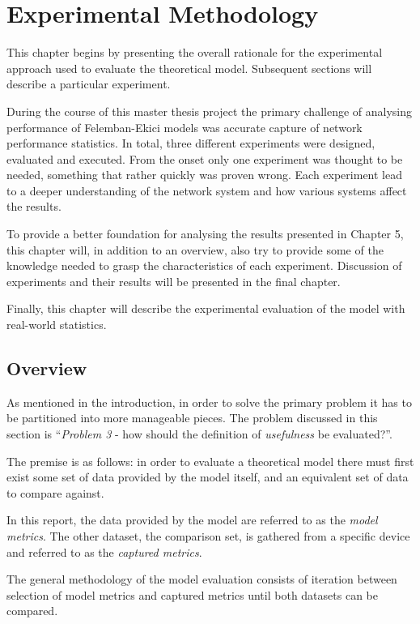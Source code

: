 
\chapter{Experimental Methodology}

This chapter begins by presenting the overall rationale for the experimental
approach used to evaluate the theoretical model. Subsequent sections will
describe a particular experiment.

During the course of this master thesis project the primary challenge of
analysing performance of Felemban-Ekici models was accurate capture of network
performance statistics. In total, three different experiments were designed,
evaluated and executed. From the onset only one experiment was thought to be
needed, something that rather quickly was proven wrong. Each experiment lead
to a deeper understanding of the network system and how various systems affect
the results.

To provide a better foundation for analysing the results presented in Chapter
5, this chapter will, in addition to an overview, also try to provide some of
the knowledge needed to grasp the characteristics of each experiment.
Discussion of experiments and their results will be presented in the final
chapter.

Finally, this chapter will describe the experimental evaluation of the model
with real-world statistics.

\section{Overview}

As mentioned in the introduction, in order to solve the primary problem it has
to be partitioned into more manageable pieces. The problem discussed in this
section is ``\emph{Problem 3} - how should the definition of \emph{usefulness}
be evaluated?''.

The premise is as follows: in order to evaluate a theoretical model there must
first exist some set of data provided by the model itself, and an equivalent
set of data to compare against.

In this report, the data provided by the model are referred to as the
\emph{model metrics}. The other dataset, the comparison set, is gathered from
a specific device and referred to as the \emph{captured metrics}.

The general methodology of the model evaluation consists of iteration between
selection of model metrics and captured metrics until both datasets can be
compared.


